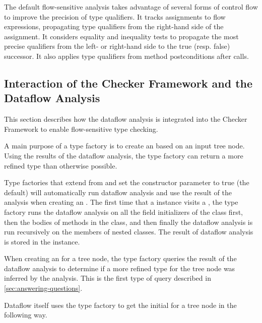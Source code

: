The default flow-sensitive analysis takes advantage of several forms
of control flow to improve the precision of type qualifiers.  It
tracks assignments to flow expressions, propagating type qualifiers
from the right-hand side of the assignment.  It considers equality and
inequality tests to propagate the most precise qualifiers from the
left- or right-hand side to the true (resp. false) successor.  It also
applies type qualifiers from method postconditions after calls.



\subsection{Interaction of the Checker Framework and the Dataflow Analysis}
\label{sec:flow-cf-interaction}

This section describes how the dataflow analysis is integrated into the
Checker Framework to enable flow-sensitive type checking.

A main purpose of a type factory is to create an 
based on an input tree node. Using the results of the dataflow analysis,
the type factory can return a more refined type than otherwise possible.

Type factories that extend from 
and set the constructor parameter  to true (the default) will automatically
run dataflow analysis and use the result of the analysis when creating an
.  The first time that a 
instance visits a , the type factory runs the dataflow analysis
on all the field initializers of the class first, then the bodies of methods in
the class, and then finally the dataflow analysis is
run recursively on the members of nested classes. The result of
dataflow analysis is stored in the  instance.

When creating an  for a tree node, the type factory
queries the result of the dataflow analysis to determine if a more refined
type for the tree node was inferred by the analysis. This is the first
type of query described in \autoref{sec:answering-questions}.

Dataflow itself uses the type factory to get the initial
 for a tree node in the following way.

